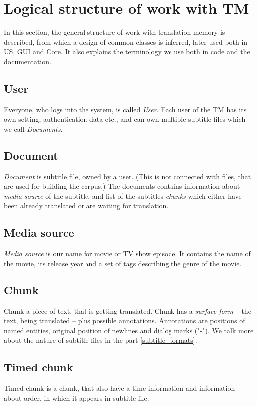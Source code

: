 \section{Logical structure of work with TM}
\label{sec:shared_structure}

In this section, the general structure of work with translation memory is described, from which a design of common classes is inferred, later used both in US, GUI and Core. It also explains the terminology we use both in code and the documentation.

\subsection*{User}
Everyone, who logs into the system, is called \emph{User}. Each user of the TM has its own setting, authentication data etc., and can own multiple subtitle files which we call \emph{Documents}.

\subsection*{Document}
\emph{Document} is subtitle file, owned by a user. (This is not connected with files, that are used for building the corpus.) The documents contains information about \emph{media source} of the subtitle, and list of the subtitles \emph{chunks} which either have been already translated or are waiting for translation.

\subsection*{Media source}
\emph{Media source} is our name for movie or TV show episode. It contains the name of the movie, its release year and a set of tags describing the genre of the movie.

\subsection*{Chunk}
Chunk a piece of text, that is getting translated. Chunk has a \emph{surface form} -- the text, being translated -- plus possible annotations. Annotations are positions of named entities, original position of newlines and dialog marks ("-"). We talk more about the nature of subtitle files in the part \ref{subtitle_formats}.

\subsection*{Timed chunk}
Timed chunk is a chunk, that also have a time information and information about order, in which it appears in subtitle file.

